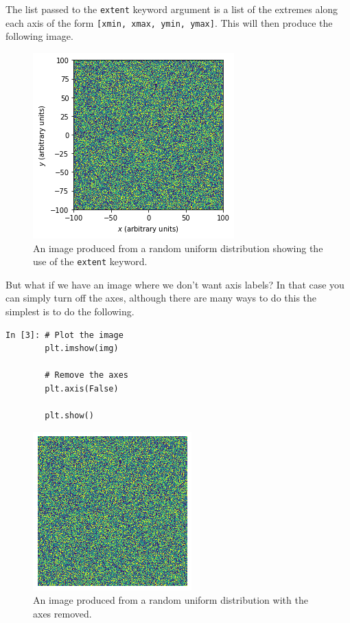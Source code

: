 The list passed to the \texttt{extent} keyword argument is a list of the extremes along each axis of the form \texttt{[xmin, xmax, ymin, ymax]}. This will then produce the following image.

\begin{figure}[H]
	\centering
	\includegraphics[scale=0.7]{Pictures/randomimgexampleextent.png}
\caption{An image produced from a random uniform distribution showing the use of the \texttt{extent} keyword.}
\label{fig:randimgextent}
\end{figure}

But what if we have an image where we don't want axis labels? In that case you can simply turn off the axes, although there are many ways to do this the simplest is to do the following.

\begin{lstlisting}[style=PY]
In [3]: # Plot the image
        plt.imshow(img)

        # Remove the axes
        plt.axis(False)
        
        plt.show()
\end{lstlisting}

\begin{figure}[H]
	\centering
	\includegraphics[scale=0.7]{Pictures/randomimgexamplenoaxis.png}
\caption{An image produced from a random uniform distribution with the axes removed.}
\label{fig:randimgnoax}
\end{figure}

